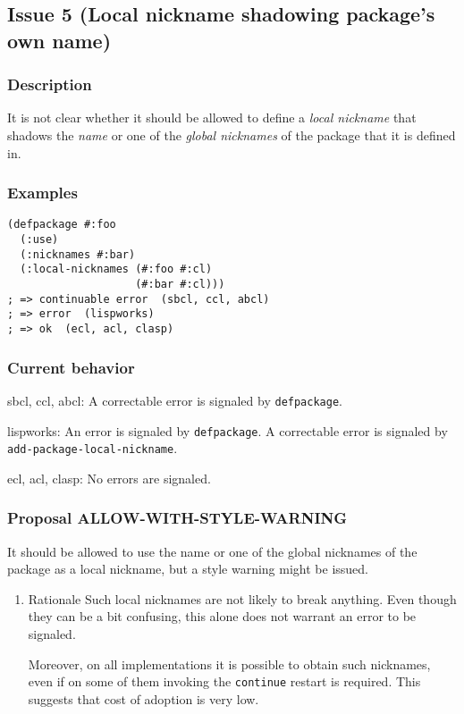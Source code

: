 \documentclass[11pt]{article}
\begin{document}
\subsection{Issue 5 (Local nickname shadowing package's own name)}
\label{sec:org72887a2}
\subsubsection{Description}
\label{sec:orged58d1d}
It is not clear whether it should be allowed to define a \emph{local nickname} that
shadows the \emph{name} or one of the \emph{global nicknames} of the package that it is
defined in.
\subsubsection{Examples}
\label{sec:org2a986b3}
\begin{verbatim}
(defpackage #:foo
  (:use)
  (:nicknames #:bar)
  (:local-nicknames (#:foo #:cl)
                    (#:bar #:cl)))
; => continuable error  (sbcl, ccl, abcl)
; => error  (lispworks)
; => ok  (ecl, acl, clasp)
\end{verbatim}
\subsubsection{Current behavior}
\label{sec:org31dc112}
sbcl, ccl, abcl:
  A correctable error is signaled by \texttt{defpackage}.

lispworks:
  An error is signaled by \texttt{defpackage}.
  A correctable error is signaled by \texttt{add-package-local-nickname}.

ecl, acl, clasp:
  No errors are signaled.
\subsubsection{Proposal ALLOW-WITH-STYLE-WARNING}
\label{sec:orgab25805}
It should be allowed to use the name or one of the global nicknames of the package
as a local nickname, but a style warning might be issued.
\begin{enumerate}
\item Rationale
\label{sec:orgfc9fd35}
Such local nicknames are not likely to break anything. Even though they can be a
bit confusing, this alone does not warrant an error to be signaled.

Moreover, on all implementations it is possible to obtain such nicknames, even if
on some of them invoking the \texttt{continue} restart is required. This suggests that
cost of adoption is very low.
\end{enumerate}
\end{document}
